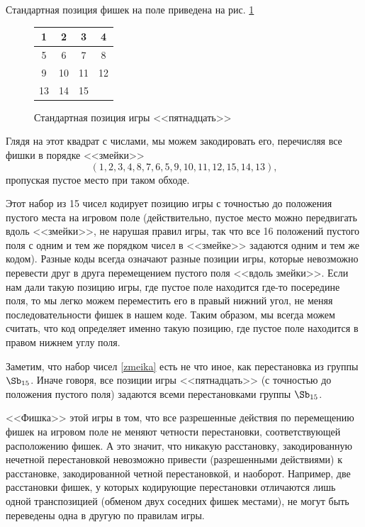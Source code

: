 \begin{enumerate}
Стандартная позиция фишек на поле приведена на рис. \ref{std15}
\begin{figure}[hbt!]
\begin{center}
\begin{tabular}{|c|c|c|c|}
\hline
1 & 2 & 3 & 4 \\ \hline
5 & 6 & 7 & 8 \\ \hline
9 & 10 & 11 & 12 \\ \hline
13 &14 & 15 & \\ \hline
\end{tabular}
\end{center}\caption{Стандартная позиция игры <<пятнадцать>>}\label{std15}
\end{figure}

Глядя на этот квадрат с числами, мы можем закодировать его, перечисляя все фишки в порядке <<змейки>>
\begin{equation}\label{zmeika}
(1,2,3,4,8,7,6,5,9,10,11,12,15,14,13),
\end{equation}
пропуская пустое место при таком обходе.

Этот набор из 15 чисел кодирует позицию игры с точностью до положения пустого места на игровом поле (действительно, пустое место можно передвигать вдоль <<змейки>>, не нарушая правил игры, так что все 16 положений пустого поля с одним и тем же порядком чисел в <<змейке>> задаются одним и тем же кодом). Разные коды всегда означают разные позиции игры, которые невозможно перевести друг в друга перемещением пустого поля <<вдоль змейки>>. Если нам дали такую позицию игры, где пустое поле находится где-то посередине поля, то мы легко можем переместить его в правый нижний угол, не меняя последовательности фишек в нашем коде. Таким образом, мы всегда можем считать, что код определяет именно такую позицию, где пустое поле находится в правом нижнем углу поля.

Заметим, что набор чисел \eqref{zmeika} есть не что иное, как перестановка из группы $\Sb_{15}$. Иначе говоря, все позиции игры <<пятнадцать>> (с точностью до положения пустого поля) задаются всеми перестановками группы $\Sb_{15}$.

<<Фишка>> этой игры в том, что все разрешенные действия по перемещению фишек на игровом поле не меняют четности перестановки, соответствующей расположению фишек. А это значит, что никакую расстановку, закодированную нечетной перестановкой невозможно привести (разрешенными действиями) к расстановке, закодированной четной перестановкой, и наоборот. Например, две расстановки фишек, у которых кодирующие перестановки отличаются лишь одной транспозицией (обменом двух соседних фишек местами), не могут быть переведены одна в другую по правилам игры.


\end{enumerate}
